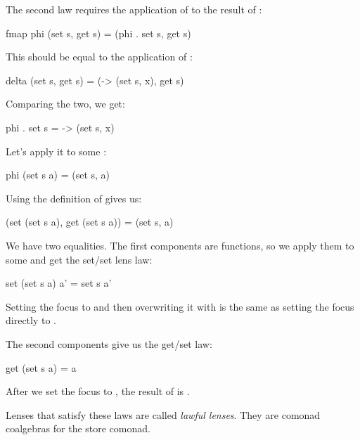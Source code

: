 \documentclass[DaoFP]{subfiles}
\begin{document}
The second law requires the application of  to the result of :
\begin{haskell}
fmap phi (set s, get s) = (phi . set s, get s)
\end{haskell}
This should be equal to the application of :
\begin{haskell}
delta (set s, get s) = (\x -> (set s, x), get s)
\end{haskell}
Comparing the two, we get:
\begin{haskell}
phi . set s = \x -> (set s, x)
\end{haskell}
Let's apply it to some :
\begin{haskell}
phi (set s a) = (set s, a)
\end{haskell}
Using the definition of  gives us:
\begin{haskell}
(set (set s a), get (set s a)) = (set s, a)
\end{haskell}
We have two equalities. The first components are functions, so we apply them to some  and get the set/set lens law:
\begin{haskell}
set (set s a) a' = set s a'
\end{haskell}
Setting the focus to  and then overwriting it with  is the same as setting the focus directly to .

The second components give us the get/set law:
\begin{haskell}
get (set s a) = a
\end{haskell}
After we set the focus to , the result of  is .

Lenses that satisfy these laws are called \emph{lawful lenses}. They are comonad coalgebras for the store comonad.
\end{document}
